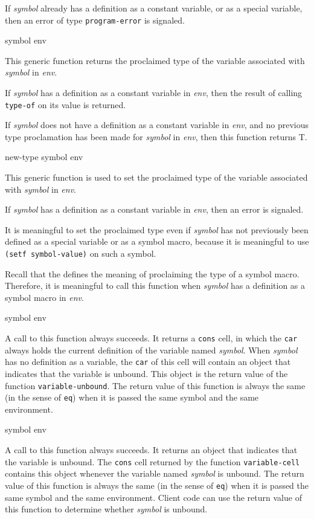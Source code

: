 If \textit{symbol} already has a definition as a constant variable, or
as a special variable, then an error of type \texttt{program-error} is
signaled.

 {symbol env}

This generic function returns the proclaimed type of the variable
associated with \textit{symbol} in \textit{env}.

If \textit{symbol} has a definition as a constant variable in \textit{env},
then the result of calling \texttt{type-of} on its value is returned.

If \textit{symbol} does not have a definition as a constant variable in
\textit{env}, and no previous type proclamation has been made for
\textit{symbol} in \textit{env}, then this function returns T.

 {new-type symbol env}

This generic function is used to set the proclaimed type of the
variable associated with \textit{symbol} in \textit{env}.

If \textit{symbol} has a definition as a constant variable in \textit{env},
then an error is signaled.

It is meaningful to set the proclaimed type even if \textit{symbol}
has not previously been defined as a special variable or as a symbol
macro, because it is meaningful to use \texttt{(setf symbol-value)} on
such a symbol.

Recall that the \hs{} defines the meaning of proclaiming the
type of a symbol macro.  Therefore, it is meaningful to call this
function when \textit{symbol} has a definition as a symbol macro in
\textit{env}.

 {symbol env}

A call to this function always succeeds.  It returns a \texttt{cons}
cell, in which the \texttt{car} always holds the current definition of
the variable named \textit{symbol}.  When \textit{symbol} has no
definition as a variable, the \texttt{car} of this cell will contain
an object that indicates that the variable is unbound.  This object is
the return value of the function \texttt{variable-unbound}.  The
return value of this function is always the same (in the sense
of \texttt{eq}) when it is passed the same symbol and the same
environment.

 {symbol env}

A call to this function always succeeds.  It returns an object that
indicates that the variable is unbound.  The \texttt{cons} cell
returned by the function \texttt{variable-cell} contains this object
whenever the variable named \textit{symbol} is unbound.  The return
value of this function is always the same (in the sense
of \texttt{eq}) when it is passed the same symbol and the same
environment.  Client code can use the return value of this function to
determine whether
\textit{symbol} is unbound.
